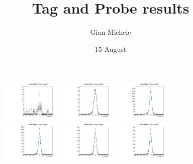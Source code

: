 \documentclass{article}
\begin{document}
\title{Tag and Probe results }
\author{Gian Michele}
\date{15 August}



\maketitle

\begin{figure}
    \includegraphics[width=0.25\textwidth]{../PlotsRooFitMC/croofit_trg_pass_0.pdf}
    \includegraphics[width=0.25\textwidth]{../PlotsRooFitMC/croofit_trg_pass_1.pdf}
    \includegraphics[width=0.25\textwidth]{../PlotsRooFitMC/croofit_trg_pass_2.pdf}
    \includegraphics[width=0.25\textwidth]{../PlotsRooFitMC/croofit_trg_pass_3.pdf}
    \includegraphics[width=0.25\textwidth]{../PlotsRooFitMC/croofit_trg_pass_4.pdf}
    \includegraphics[width=0.25\textwidth]{../PlotsRooFitMC/croofit_trg_pass_5.pdf}

\end{figure}
\end{document}
